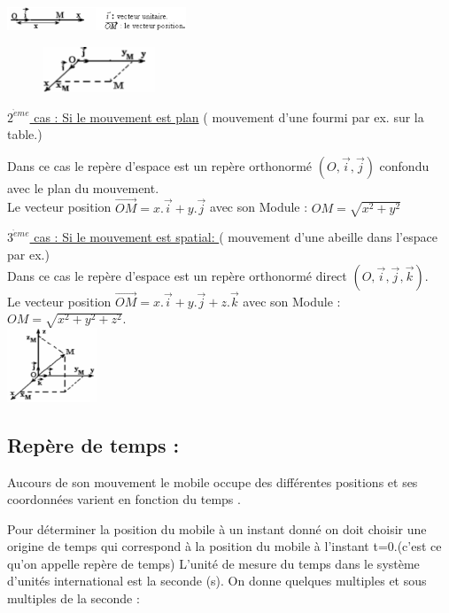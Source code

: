 \documentclass[12pt]{article}
\begin{document}
\includegraphics[width=0.4\textwidth]{./img/img01.png}
\\
\begin{figure}
\includegraphics[width=0.3\textwidth]{./img/img02.png}
\end{figure}
\underline{$2^{\grave{e}me}$ cas : Si le mouvement est plan} ( mouvement d'une fourmi par ex. sur la table.)

Dans ce cas le repère d'espace est un repère orthonormé $(O, \vec{i}, \vec{j})$ confondu avec le plan du mouvement.
\\Le vecteur position $\overrightarrow{OM} = x.\vec{i} + y.\vec{j}$ avec son Module : $OM =\sqrt{x^2 + y^2} $



\underline{$3^{\grave{e}me}$ cas : Si le mouvement est spatial: }( mouvement d'une abeille dans l'espace par ex.)
\\Dans ce cas le repère d'espace est un repère orthonormé direct $(O, \vec{i}, \vec{j}, \vec{k})$. 
\\Le vecteur position $\overrightarrow{OM} = x.\vec{i} + y.\vec{j} + z.\vec{k}$ avec son Module : $OM =\sqrt{x^2 + y^2 + z^2} $.
\\\includegraphics[width=0.2\textwidth]{./img/img03.png}

\subsection{Repère de temps : }
Aucours de son mouvement le mobile occupe des différentes positions et ses coordonnées varient en fonction du
temps .

Pour déterminer la position du mobile à un instant donné on doit choisir une origine de temps qui correspond à
la position du mobile à l'instant t=0.(c'est ce qu'on appelle repère de temps)
L'unité de mesure du temps dans le système d'unités international est la seconde (s).
On donne quelques multiples et sous multiples de la seconde :
\end{document}
